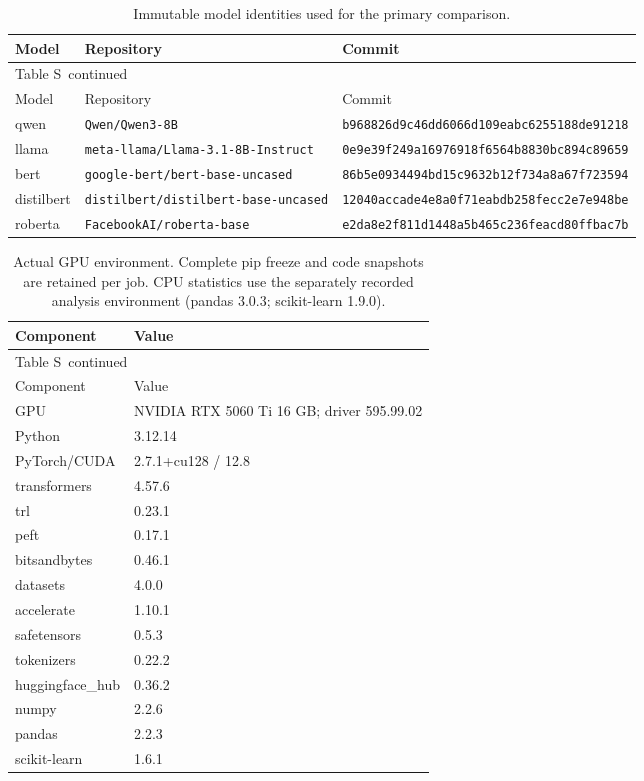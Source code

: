 \documentclass[10pt,a4paper]{article}
\renewcommand{\thetable}{S\arabic{table}}
\begin{document}
{\small
\setlength{\tabcolsep}{4pt}
\begin{longtable}{@{}p{16mm}p{55mm}p{86mm}@{}}
\caption{Immutable model identities used for the primary comparison.}\label{sup:pins}\\
\toprule
Model & Repository & Commit \\
\midrule\endfirsthead
\multicolumn{3}{l}{\small Table \thetable\ continued}\\
\toprule
Model & Repository & Commit \\
\midrule\endhead
\bottomrule\endfoot
qwen & \nolinkurl{Qwen/Qwen3-8B} & \nolinkurl{b968826d9c46dd6066d109eabc6255188de91218} \\
llama & \nolinkurl{meta-llama/Llama-3.1-8B-Instruct} & \nolinkurl{0e9e39f249a16976918f6564b8830bc894c89659} \\
bert & \nolinkurl{google-bert/bert-base-uncased} & \nolinkurl{86b5e0934494bd15c9632b12f734a8a67f723594} \\
distilbert & \nolinkurl{distilbert/distilbert-base-uncased} & \nolinkurl{12040accade4e8a0f71eabdb258fecc2e7e948be} \\
roberta & \nolinkurl{FacebookAI/roberta-base} & \nolinkurl{e2da8e2f811d1448a5b465c236feacd80ffbac7b} \\
\end{longtable}
}


{\small
\setlength{\tabcolsep}{4pt}
\begin{longtable}{@{}p{42mm}p{115mm}@{}}
\caption{Actual GPU environment. Complete pip freeze and code snapshots are retained per job. CPU statistics use the separately recorded analysis environment (pandas 3.0.3; scikit-learn 1.9.0).}\label{sup:environment}\\
\toprule
Component & Value \\
\midrule\endfirsthead
\multicolumn{2}{l}{\small Table \thetable\ continued}\\
\toprule
Component & Value \\
\midrule\endhead
\bottomrule\endfoot
GPU & NVIDIA RTX 5060 Ti 16 GB; driver 595.99.02 \\
Python & 3.12.14 \\
PyTorch/CUDA & 2.7.1+cu128 / 12.8 \\
transformers & 4.57.6 \\
trl & 0.23.1 \\
peft & 0.17.1 \\
bitsandbytes & 0.46.1 \\
datasets & 4.0.0 \\
accelerate & 1.10.1 \\
safetensors & 0.5.3 \\
tokenizers & 0.22.2 \\
huggingface\_hub & 0.36.2 \\
numpy & 2.2.6 \\
pandas & 2.2.3 \\
scikit-learn & 1.6.1 \\
\end{longtable}
}
\end{document}
